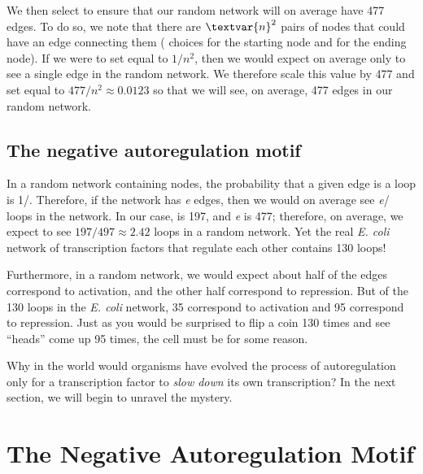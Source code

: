 We then select  to ensure that our random network will on average have 477 edges. To do so, we note that there are $\textvar{n}^2$ pairs of nodes that could have an edge connecting them ( choices for the starting node and  for the ending node). If we were to set  equal to $1/n^2$, then we would expect on average only to see a single edge in the random network. We therefore scale this value by 477 and set  equal to $477/n^2 \approx 0.0123$ so that we will see, on average, 477 edges in our random network.

\FloatBarrier
{}
\subsection{The negative autoregulation motif}

In a random network containing  nodes, the probability that a given edge is a loop is 1/. Therefore, if the network has \textit{e} edges, then we would on average see \textit{e}/ loops in the network. In our case,  is 197, and \textit{e} is 477; therefore, on average, we expect to see $197/497 \approx 2.42$ loops in a random network. Yet the real \textit{E. coli} network of transcription factors that regulate each other contains 130 loops!

Furthermore, in a random network, we would expect about half of the edges correspond to activation, and the other half correspond to repression. But of the 130 loops in the \textit{E. coli} network, 35 correspond to activation and 95 correspond to repression. Just as you would be surprised to flip a coin 130 times and see ``heads'' come up 95 times, the cell must be  for some reason.

Why in the world would organisms have evolved the process of autoregulation only for a transcription factor to \textit{slow down} its own transcription? In the next section, we will begin to unravel the mystery.\\


\FloatBarrier
{}

\section{The Negative Autoregulation Motif}
\label{sec:the_negative_autoregulation_motif}

